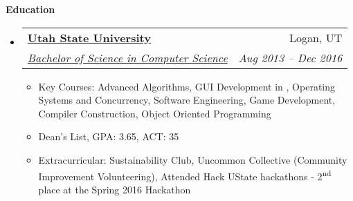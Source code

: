 \documentclass[letterpaper,11pt]{article}
\makeatletter
\newcommand{\resitem}[1]{\item #1 \vspace{-2pt}}
\newcommand{\resheading}[1]{{\large \colorbox{mygrey}{\begin{minipage}{\textwidth}{\textbf{#1 \vphantom{p\^{E}}}}\end{minipage}}}}
\newcommand{\ressubheading}[4]{
\begin{tabular*}{6.5in}{l@{\extracolsep{\fill}}r}
		\textbf{#1} & #2 \\
		\textit{#3} & \textit{#4} \\
\end{tabular*}\vspace{-6pt}}
\makeatother
\begin{document}
\begin{itemize}

	\end{itemize}  %

\resheading{Education}
	\begin{itemize}
		\item
			\ressubheading{\href{http://www.usu.edu}{Utah State University}}{Logan, UT}{\href{http://www.cs.usu.edu}{Bachelor of Science in Computer Science}}{Aug 2013 -- Dec 2016}
				{ \footnotesize
				\begin{itemize}
					\resitem{Key Courses: Advanced Algorithms, GUI Development in \CS, Operating Systems and Concurrency, Software Engineering, Game Development, Compiler Construction, Object Oriented Programming}
					\resitem{Dean's List, GPA: 3.65, ACT: 35}
					\resitem{Extracurricular: Sustainability Club, Uncommon Collective (Community Improvement Volunteering), Attended Hack UState hackathons - 2\textsuperscript{nd} place at the Spring 2016 Hackathon}
				\end{itemize}
				}
	\end{itemize} %
	
\end{document}

